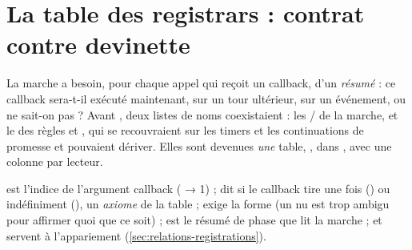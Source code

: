 \section{La table des registrars : contrat contre devinette}
\label{sec:relations-registrars}
La marche a besoin, pour chaque appel qui reçoit un callback, d'un \emph{résumé} : ce callback sera-t-il exécuté maintenant, sur un tour ultérieur, sur un événement, ou ne sait-on pas ? Avant , deux listes de noms coexistaient : les  /  de la marche, et le  des règles  et , qui se recouvraient sur les timers et les continuations de promesse et pouvaient dériver. Elles sont devenues \emph{une} table, , dans , avec une colonne par lecteur.


 est l'indice de l'argument callback ( → 1) ;  dit si le callback tire une fois () ou indéfiniment (), un \emph{axiome} de la table ;  exige la forme  (un  nu est trop ambigu pour affirmer quoi que ce soit) ;  est le résumé de phase que lit la marche ;  et  servent à l'appariement (\cref{sec:relations-registrations}).

